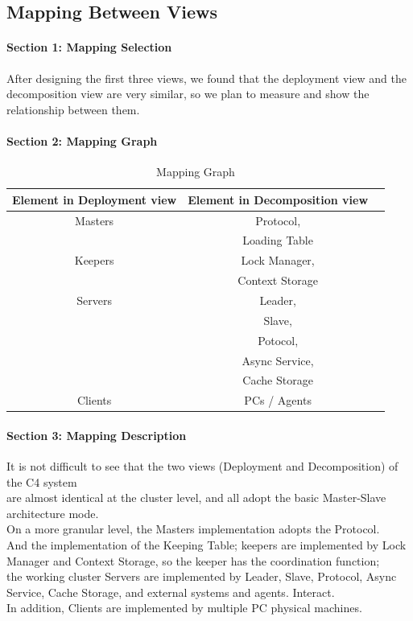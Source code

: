 \documentclass{article}
\begin{document}
	\subsection{Mapping Between Views}
		\paragraph{Section 1: Mapping Selection}
		After designing the first three views, we found that the deployment view and the decomposition view are very similar, so we plan to measure and show the relationship between them.
		\paragraph{Section 2: Mapping Graph}
		\begin{center}
			\begin{table}[!htb]
			\begin{tabular}{ccc}
			\toprule  
			Element in Deployment view & Element in Decomposition view\\
			\midrule 
			Masters		& Protocol,\\
						& Loading Table\\
			Keepers		& Lock Manager,\\
						& Context Storage\\
			Servers		& Leader,\\
						& Slave,\\
						& Potocol,\\
						& Async Service,\\
						& Cache Storage\\
			Clients		& PCs / Agents\\
			\bottomrule
			\end{tabular}
			\caption{Mapping Graph}
			\end{table}
		\end{center}
		\paragraph{Section 3: Mapping Description}
		It is not difficult to see that the two views (Deployment and Decomposition) of the C4 system\\
		are almost identical at the cluster level, and all adopt the basic Master-Slave architecture mode. \\
		On a more granular level, the Masters implementation adopts the Protocol.\\
		And the implementation of the Keeping Table; keepers are implemented by Lock Manager and Context Storage, so the keeper has the coordination function; \\
		the working cluster Servers are implemented by Leader, Slave, Protocol, Async Service, Cache Storage, and external systems and agents. Interact. \\
		In addition, Clients are implemented by multiple PC physical machines.\\
\end{document}
